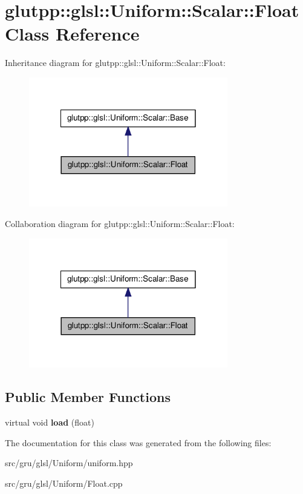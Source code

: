 \hypertarget{classglutpp_1_1glsl_1_1Uniform_1_1Scalar_1_1Float}{\section{glutpp\-:\-:glsl\-:\-:\-Uniform\-:\-:\-Scalar\-:\-:\-Float \-Class \-Reference}
\label{classglutpp_1_1glsl_1_1Uniform_1_1Scalar_1_1Float}
}


\-Inheritance diagram for glutpp\-:\-:glsl\-:\-:\-Uniform\-:\-:\-Scalar\-:\-:\-Float\-:
\nopagebreak
\begin{figure}[H]
\begin{center}
\leavevmode
\includegraphics[width=246pt]{classglutpp_1_1glsl_1_1Uniform_1_1Scalar_1_1Float__inherit__graph}
\end{center}
\end{figure}


\-Collaboration diagram for glutpp\-:\-:glsl\-:\-:\-Uniform\-:\-:\-Scalar\-:\-:\-Float\-:
\nopagebreak
\begin{figure}[H]
\begin{center}
\leavevmode
\includegraphics[width=246pt]{classglutpp_1_1glsl_1_1Uniform_1_1Scalar_1_1Float__coll__graph}
\end{center}
\end{figure}
\subsection*{\-Public \-Member \-Functions}
\begin{DoxyCompactItemize}
\item 
\hypertarget{classglutpp_1_1glsl_1_1Uniform_1_1Scalar_1_1Float_a164add400fc3572a72ac8ea4a6fe7860}{virtual void {\bfseries load} (float)}\label{classglutpp_1_1glsl_1_1Uniform_1_1Scalar_1_1Float_a164add400fc3572a72ac8ea4a6fe7860}

\end{DoxyCompactItemize}


\-The documentation for this class was generated from the following files\-:\begin{DoxyCompactItemize}
\item 
src/gru/glsl/\-Uniform/uniform.\-hpp\item 
src/gru/glsl/\-Uniform/\-Float.\-cpp\end{DoxyCompactItemize}
